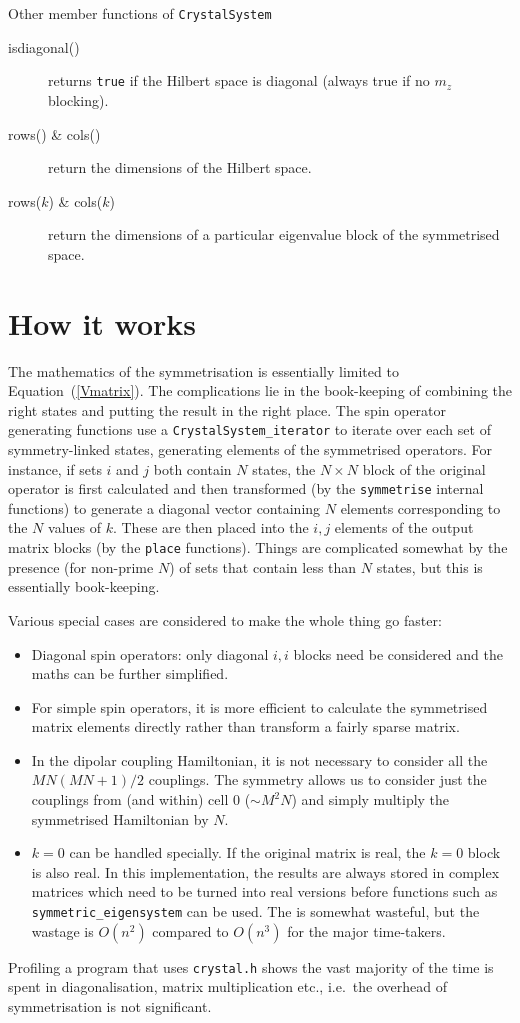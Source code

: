 \documentclass[11pt,a4paper]{article}
\begin{document}
Other member functions of {\tt CrystalSystem}
\begin{description}
\item[isdiagonal()] returns {\tt true} if the Hilbert space is diagonal (always true
if no $m_z$ blocking).
\item[rows() \& cols()] return the dimensions of the Hilbert space.
\item[rows($k$) \& cols($k$)] return the dimensions of a particular eigenvalue block
of the symmetrised space. 
\end{description}

\section{How it works}

The mathematics of the symmetrisation is essentially limited to
Equation~(\ref{Vmatrix}).  The complications lie in the book-keeping of
combining the right states and putting the result in the right place.
The spin operator generating functions use a {\tt CrystalSystem\_iterator} to
iterate over each set
of symmetry-linked states, generating elements of the symmetrised operators.
For instance, if sets $i$ and $j$ both contain $N$ states, the $N \times N$
block of the original operator is first calculated and then transformed
(by the {\tt symmetrise} internal functions)
to generate a diagonal vector containing $N$ elements corresponding to the
$N$ values of $k$.  These are then placed into the $i,j$ elements of the
output matrix blocks (by the {\tt place} functions).  Things are complicated somewhat by the presence (for
non-prime $N$) of sets that contain less than $N$ states, but this is 
essentially book-keeping.

Various special cases are considered to make the whole thing go faster:
\begin{itemize}
\item Diagonal spin operators: only diagonal $i,i$ blocks need be considered
and the maths can be further simplified.
\item For simple spin operators, it is more efficient to calculate the symmetrised
matrix elements directly rather than transform a fairly sparse matrix.
\item In the dipolar coupling Hamiltonian, it is not necessary to consider 
all the $MN(MN+1)/2$ couplings.  The symmetry allows us to consider 
just the couplings from (and within) cell 0 ($\sim M^2N$) and simply multiply the
symmetrised Hamiltonian by $N$.
\item $k=0$ can be handled specially.  If the original matrix is real, the $k=0$ block is also real.  In this implementation, the results are always stored
in complex matrices which need to be turned into real versions before
functions such as {\tt symmetric\_eigensystem} can be used.
The is somewhat wasteful, but the wastage is $O(n^2)$ compared to $O(n^3)$
for the major time-takers.
\end{itemize}

Profiling a program that uses {\tt crystal.h} shows
the vast majority of the time is spent in diagonalisation, matrix multiplication etc.,
i.e.\ the overhead of symmetrisation is not significant.
\end{document}
